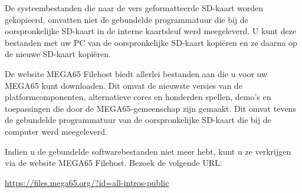 De systeembestanden die naar de vers geformatteerde SD-kaart worden gekopieerd, omvatten niet de gebundelde programmatuur die bij de oorspronkelijke SD-kaart in de interne kaartsleuf werd meegeleverd. U kunt deze bestanden met uw PC van de oorspronkelijke SD-kaart kopiëren en ze daarna op de nieuwe SD-kaart kopiëren.

De website MEGA65 Filehost biedt allerlei bestanden aan die u voor uw MEGA65 kunt downloaden. Dit omvat de nieuwste versies van de platformcomponenten, alternatieve cores en honderden spellen, demo's en toepassingen die door de MEGA65-gemeenschap zijn gemaakt. Dit omvat tevens de gebundelde programmatuur van de oorspronkelijke SD-kaart die bij de computer werd meegeleverd.

Indien u de gebundelde softwarebestanden niet meer hebt, kunt u ze verkrijgen via de website MEGA65 Filehost. Bezoek de volgende URL:

\url{https://files.mega65.org/?id=all-intros-public}
